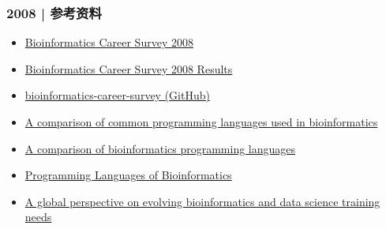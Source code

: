 \begin{frame}
  \frametitle{2008 | 参考资料}
  \begin{itemize}
    \item \href{http://openwetware.org/wiki/Biogang:Projects/Nioinformatics\_Career\_Survey\_2008}{Bioinformatics Career Survey 2008}
    \item \href{http://openwetware.org/wiki/Biogang:Projects/Bioinformatics\_Career\_Survey\_2008\_Results}{Bioinformatics Career Survey 2008 Results}
    \item \href{https://github.com/michaelbarton/bioinformatics-career-survey}{bioinformatics-career-survey (GitHub)}
    \item \href{http://www.ncbi.nlm.nih.gov/pmc/articles/PMC2267699/}{A comparison of common programming languages used in bioinformatics}
    \item \href{http://www.molecularecologist.com/2012/11/a-comparison-of-bioinformatics-programming-languages/}{A comparison of bioinformatics programming languages}
    \item \href{https://nlcb.wordpress.com/2013/02/23/programming-languages-of-bioinformatics-2/}{Programming Languages of Bioinformatics}
    \item \href{https://www.ncbi.nlm.nih.gov/pubmed/28968751}{A global perspective on evolving bioinformatics and data science training needs}
  \end{itemize}
\end{frame}

